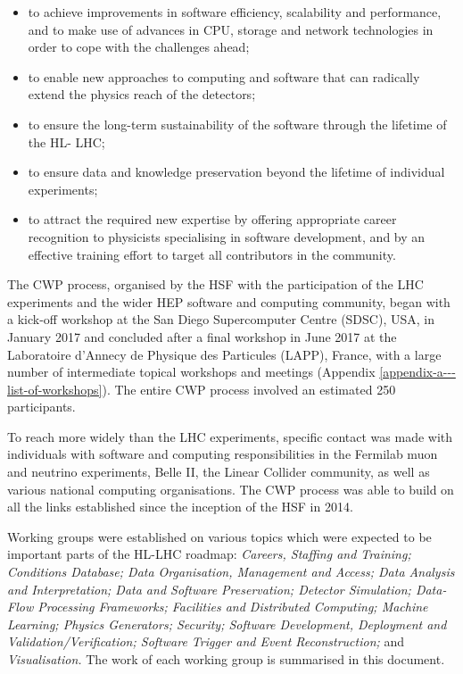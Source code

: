 \documentclass[twocolumn]{svjour3}          %
\begin{document}
\begin{itemize}
\item
  to achieve improvements in software efficiency, scalability and
  performance, and to make use of advances in CPU, storage and network
  technologies in order to cope with the challenges ahead;
\item
  to enable new approaches to computing and software that can radically
  extend the physics reach of the detectors;
\item
  to ensure the long-term sustainability of the software through the
  lifetime of the HL- LHC;
\item
  to ensure data and knowledge preservation beyond the lifetime of
  individual experiments;
\item
  to attract the required new expertise by offering appropriate career
  recognition to physicists specialising in software development, and by
  an effective training effort to target all contributors in the
  community.
\end{itemize}

The CWP process, organised by the HSF with the participation of the LHC
experiments and the wider HEP software and computing community, began
with a kick-off workshop at the San Diego Supercomputer Centre (SDSC),
USA, in January 2017 and concluded after a final workshop in June 2017 at
the Laboratoire d'Annecy de Physique des Particules (LAPP), France, with
a large number of intermediate topical workshops and meetings
(Appendix \ref{appendix-a---list-of-workshops}). The
entire CWP process involved an estimated 250 participants.

To reach more widely than the LHC experiments, specific contact was made
with individuals with software and computing responsibilities in the
Fermilab muon and neutrino experiments, Belle II, the Linear Collider
community, as well as various national computing organisations. The CWP
process was able to build on all the links established since the
inception of the HSF in 2014.

Working groups were established on various topics which were expected to
be important parts of the HL-LHC roadmap: \emph{Careers, Staffing and
Training; Conditions Database; Data Organisation, Management and Access;
Data Analysis and Interpretation; Data and Software Preservation;
Detector Simulation; Data-Flow Processing Frameworks; Facilities and
Distributed Computing; Machine Learning; Physics Generators; Security;
Software Development, Deployment and Validation/Verification; Software
Trigger and Event Reconstruction;} and \emph{Visualisation.} The work of
each working group is summarised in this document.
\end{document}
